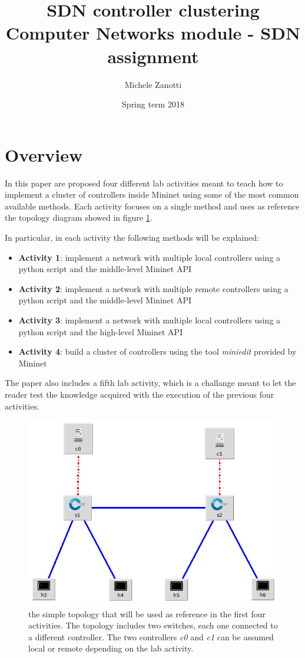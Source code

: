\documentclass[12pt, a4paper]{article}
\title{SDN controller clustering \\ \large Computer Networks module - SDN assignment}
\author{Michele Zanotti}
\date{Spring term 2018}
\begin{document}
\maketitle


\section*{Overview}
In this paper are proposed four different lab activities meant to teach how to implement
a cluster of controllers inside Mininet using some of the most common available methods.
Each activity focuses on a single method and uses as reference the topology
diagram showed in figure \ref{fig:topology-1}.

In particular, in each activity the following methods will be explained:
\begin{itemize}
  \item \textbf{Activity 1}: implement a network with multiple local controllers using a python
  script and the middle-level Mininet API
  \item \textbf{Activity 2}: implement a network with multiple remote controllers using a python
  script and the middle-level Mininet API
  \item \textbf{Activity 3}: implement a network with multiple local controllers using a python
  script and the high-level Mininet API
  \item \textbf{Activity 4}: build a cluster of controllers using the tool
  \emph{miniedit} provided by Mininet
\end{itemize}

The paper also includes a fifth lab activity, which is a challange meant
to let the reader test the knowledge acquired with the execution of the previous
four activities.

\begin{figure}[htb]
	\centering
	\includegraphics[width=0.9\linewidth]{img/topology-1.png}
	\caption{the simple topology that will be used as reference in the first four
  activities. The topology includes two switches, each one connected to a different
  controller. The two controllers \emph{c0} and \emph{c1} can be assumed local or
  remote depending on the lab activity.}
	\label{fig:topology-1}
\end{figure}




\end{document}
